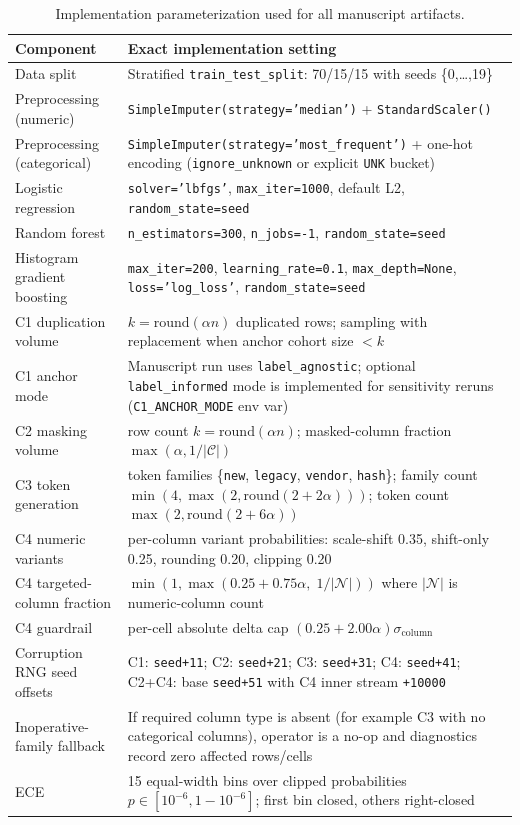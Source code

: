 \documentclass{AuthorGuide/ijitcs}
\begin{document}
\begin{table}[!t]
\caption{Implementation parameterization used for all manuscript artifacts.\label{tab:implparams}}
\begin{tabularx}{\textwidth}{lX}
\toprule
\textbf{Component} & \textbf{Exact implementation setting} \\
\midrule
Data split & Stratified \texttt{train\_test\_split}: 70/15/15 with seeds \{0,\ldots,19\} \\
Preprocessing (numeric) & \texttt{SimpleImputer(strategy='median')} + \texttt{StandardScaler()} \\
Preprocessing (categorical) & \texttt{SimpleImputer(strategy='most\_frequent')} + one-hot encoding (\texttt{ignore\_unknown} or explicit \texttt{UNK} bucket) \\
Logistic regression & \texttt{solver='lbfgs'}, \texttt{max\_iter=1000}, default L2, \texttt{random\_state=seed} \\
Random forest & \texttt{n\_estimators=300}, \texttt{n\_jobs=-1}, \texttt{random\_state=seed} \\
Histogram gradient boosting & \texttt{max\_iter=200}, \texttt{learning\_rate=0.1}, \texttt{max\_depth=None}, \texttt{loss='log\_loss'}, \texttt{random\_state=seed} \\
C1 duplication volume & $k=\mathrm{round}(\alpha n)$ duplicated rows; sampling with replacement when anchor cohort size $<k$ \\
C1 anchor mode & Manuscript run uses \texttt{label\_agnostic}; optional \texttt{label\_informed} mode is implemented for sensitivity reruns (\texttt{C1\_ANCHOR\_MODE} env var) \\
C2 masking volume & row count $k=\mathrm{round}(\alpha n)$; masked-column fraction $\max(\alpha,1/|\mathcal{C}|)$ \\
C3 token generation & token families \{\texttt{new}, \texttt{legacy}, \texttt{vendor}, \texttt{hash}\}; family count $\min(4,\max(2,\mathrm{round}(2+2\alpha)))$; token count $\max(2,\mathrm{round}(2+6\alpha))$ \\
C4 numeric variants & per-column variant probabilities: scale-shift 0.35, shift-only 0.25, rounding 0.20, clipping 0.20 \\
C4 targeted-column fraction & $\min\!\left(1,\max\!\left(0.25 + 0.75\alpha,\;1/|\mathcal{N}|\right)\right)$ where $|\mathcal{N}|$ is numeric-column count \\
C4 guardrail & per-cell absolute delta cap $(0.25 + 2.00\alpha)\sigma_{\text{column}}$ \\
Corruption RNG seed offsets & C1: \texttt{seed+11}; C2: \texttt{seed+21}; C3: \texttt{seed+31}; C4: \texttt{seed+41}; C2+C4: base \texttt{seed+51} with C4 inner stream \texttt{+10000} \\
Inoperative-family fallback & If required column type is absent (for example C3 with no categorical columns), operator is a no-op and diagnostics record zero affected rows/cells \\
ECE & 15 equal-width bins over clipped probabilities $p \in [10^{-6}, 1 - 10^{-6}]$; first bin closed, others right-closed \\
\bottomrule
\end{tabularx}
\end{table}
\end{document}
